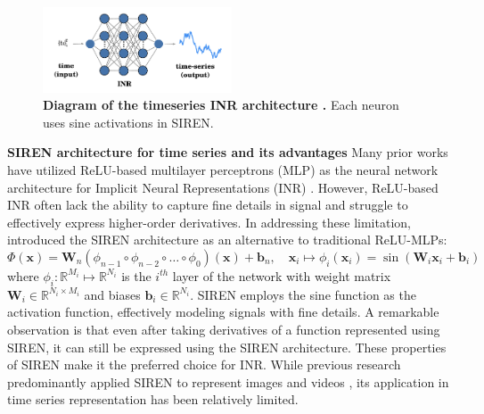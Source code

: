 \documentclass{article}
\begin{document}
\begin{figure}[htb]
  \centering
  \includegraphics[width=0.5\textwidth]{INR.png}
  \caption{\textbf{Diagram of the timeseries INR architecture \cite{fons2022hypertime} .}  Each neuron uses sine activations in SIREN.}
  \label{INR}
\end{figure}

\textbf{SIREN architecture for time series and its advantages}
Many prior works have utilized ReLU-based multilayer perceptrons (MLP) as the neural network architecture for Implicit Neural Representations (INR) \cite{genova2019learning,park2019deepsdf}. 
However, ReLU-based INR often lack the ability to capture fine details in signal and struggle to effectively express higher-order derivatives.
In addressing these limitation, \cite{sitzmann2020implicit} introduced the SIREN architecture as an alternative to traditional ReLU-MLPs:
$$
\Phi(\mathbf{x})=\mathbf{W}_n\left(\phi_{n-1} \circ \phi_{n-2} \circ \ldots \circ \phi_0\right)(\mathbf{x})+\mathbf{b}_n, \quad \mathbf{x}_i \mapsto \phi_i\left(\mathbf{x}_i\right)=\sin \left(\mathbf{W}_i \mathbf{x}_i+\mathbf{b}_i\right)
$$
where $\phi_i: \mathbb{R}^{M_i} \mapsto \mathbb{R}^{N_i}$ is the $i^{t h}$ layer of the network with weight matrix $\mathbf{W}_i \in \mathbb{R}^{N_i \times M_i}$ and biases $\mathbf{b}_i \in \mathbb{R}^{N_i}$.
SIREN employs the sine function as the activation function, effectively modeling signals with fine details.
A remarkable observation is that even after taking derivatives of a function represented using SIREN, 
it can still be expressed using the SIREN architecture. 
These properties of SIREN make it the preferred choice for INR.
While previous research predominantly applied SIREN to represent images and videos \cite{lee2021meta}, its application in time series representation has been relatively limited.
\end{document}
